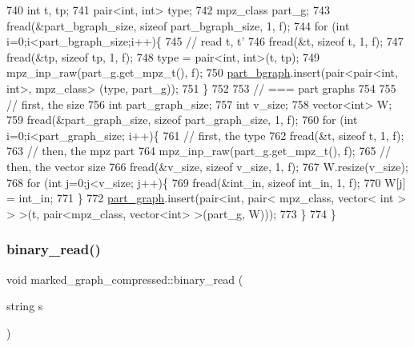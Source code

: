 \begin{DoxyCode}
740   \textcolor{keywordtype}{int} t, tp;
741   pair<int, int> type; 
742   mpz\_class part\_g; 
743   fread(&part\_bgraph\_size, \textcolor{keyword}{sizeof} part\_bgraph\_size, 1, f);
744   \textcolor{keywordflow}{for} (\textcolor{keywordtype}{int} i=0;i<part\_bgraph\_size;i++)\{
745     \textcolor{comment}{// read t, t'}
746     fread(&t, \textcolor{keyword}{sizeof} t, 1, f);
747     fread(&tp, \textcolor{keyword}{sizeof} tp, 1, f);
748     type = pair<int, int>(t, tp);
749     mpz\_inp\_raw(part\_g.get\_mpz\_t(), f);
750     \hyperlink{classmarked__graph__compressed_a7b3267063fba30b45eb21b3ba4e07536}{part\_bgraph}.insert(pair<pair<int, int>, mpz\_class> (type, part\_g));
751   \}
752 
753   \textcolor{comment}{// === part graphs}
754 
755   \textcolor{comment}{// first, the size}
756   \textcolor{keywordtype}{int} part\_graph\_size;
757   \textcolor{keywordtype}{int} v\_size;
758   vector<int> W; 
759   fread(&part\_graph\_size, \textcolor{keyword}{sizeof} part\_graph\_size, 1, f);
760   \textcolor{keywordflow}{for} (\textcolor{keywordtype}{int} i=0;i<part\_graph\_size; i++)\{
761     \textcolor{comment}{// first, the type}
762     fread(&t, \textcolor{keyword}{sizeof} t, 1, f);
763     \textcolor{comment}{// then, the mpz part}
764     mpz\_inp\_raw(part\_g.get\_mpz\_t(), f);
765     \textcolor{comment}{// then, the vector size}
766     fread(&v\_size, \textcolor{keyword}{sizeof} v\_size, 1, f);
767     W.resize(v\_size);
768     \textcolor{keywordflow}{for} (\textcolor{keywordtype}{int} j=0;j<v\_size; j++)\{
769       fread(&int\_in, \textcolor{keyword}{sizeof} int\_in, 1, f);
770       W[j] = int\_in;
771     \}
772     \hyperlink{classmarked__graph__compressed_ae179a4737e6eab905c18a94d44ef64b7}{part\_graph}.insert(pair<\textcolor{keywordtype}{int}, pair< mpz\_class, vector< int > > >(t, pair<mpz\_class, vector<int>
       >(part\_g, W)));
773   \}
774 \}
\end{DoxyCode}
\mbox{\label{classmarked__graph__compressed_a01c67fe4234738db6bb60459515c3ad8}} 
\subsubsection{\texorpdfstring{binary\+\_\+read()}{binary\_read()}\hspace{0.1cm}{\footnotesize\ttfamily [2/2]}}
{\footnotesize\ttfamily void marked\+\_\+graph\+\_\+compressed\+::binary\+\_\+read (\begin{DoxyParamCaption}\item[{string}]{s }\end{DoxyParamCaption})}

